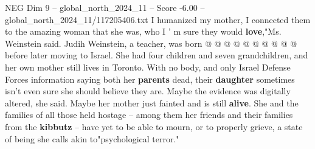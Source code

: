 \begin{textsample}{NEG Dim 9 – global\_north\_2024\_11 – Score -6.00 – global\_north\_2024\_11/117205406.txt}
I humanized my mother, I connected them to the amazing woman that she was, who I ' m sure they would \textbf{love},"Ms.
Weinstein said.
Judih Weinstein, a teacher, was born @ @ @ @ @ @ @ @ @ @ before later moving to Israel.
She had four children and seven grandchildren, and her own mother still lives in Toronto.
With no body, and only Israel Defense Forces information saying both her \textbf{parents} dead, their \textbf{daughter} sometimes isn't even sure she should believe they are.
Maybe the evidence was digitally altered, she said.
Maybe her mother just fainted and is still \textbf{alive}.
She and the families of all those held hostage -- among them her friends and their families from the \textbf{kibbutz} -- have yet to be able to mourn, or to properly grieve, a state of being she calls akin to"psychological terror."

\end{textsample}
